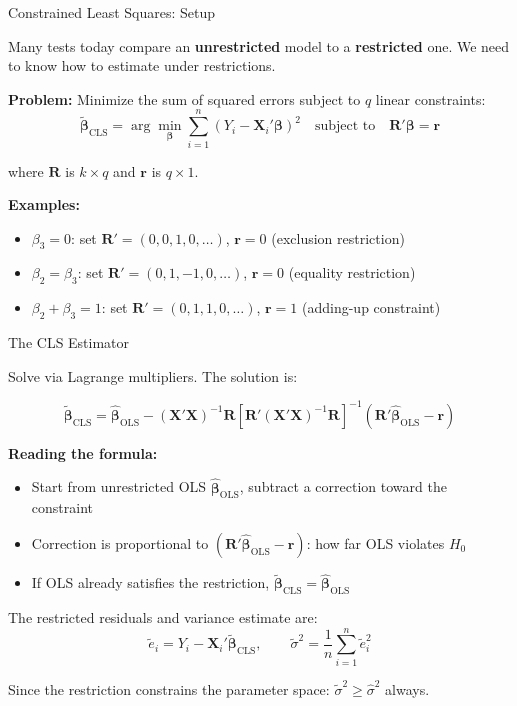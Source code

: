 \documentclass[handout, aspectratio=169]{beamer}
\numberwithin{equation}{section}
\begin{document}
\begin{frame}{Constrained Least Squares: Setup}

Many tests today compare an \textbf{unrestricted} model to a \textbf{restricted} one.  We need to know how to estimate under restrictions.

\pause
\bigskip

\textbf{Problem:} Minimize the sum of squared errors subject to $q$ linear constraints:
$$\tilde{\bm{\beta}}_{\text{CLS}} = \arg\min_{\bm{\beta}} \sum_{i=1}^n (Y_i - \bm{X}_i'\bm{\beta})^2 \quad \text{subject to} \quad \bm{R}'\bm{\beta} = \bm{r}$$

where $\bm{R}$ is $k \times q$ and $\bm{r}$ is $q \times 1$.

\pause
\bigskip

\textbf{Examples:}
\begin{itemize}
\item $\beta_3 = 0$: set $\bm{R}' = (0, 0, 1, 0, \ldots)$, $\bm{r} = 0$ \quad (exclusion restriction)
\item $\beta_2 = \beta_3$: set $\bm{R}' = (0, 1, -1, 0, \ldots)$, $\bm{r} = 0$ \quad (equality restriction)
\item $\beta_2 + \beta_3 = 1$: set $\bm{R}' = (0, 1, 1, 0, \ldots)$, $\bm{r} = 1$ \quad (adding-up constraint)
\end{itemize}
\end{frame}

\begin{frame}{The CLS Estimator}

Solve via Lagrange multipliers.  The solution is:

$$\boxed{\tilde{\bm{\beta}}_{\text{CLS}} = \hat{\bm{\beta}}_{\text{OLS}} - (\bm{X}'\bm{X})^{-1}\bm{R}\left[\bm{R}'(\bm{X}'\bm{X})^{-1}\bm{R}\right]^{-1}(\bm{R}'\hat{\bm{\beta}}_{\text{OLS}} - \bm{r})}$$

\pause
\smallskip

\textbf{Reading the formula:}
\begin{itemize}
\item Start from unrestricted OLS $\hat{\bm{\beta}}_{\text{OLS}}$, subtract a correction toward the constraint
\item Correction is proportional to $(\bm{R}'\hat{\bm{\beta}}_{\text{OLS}} - \bm{r})$: how far OLS violates $H_0$
\item If OLS already satisfies the restriction, $\tilde{\bm{\beta}}_{\text{CLS}} = \hat{\bm{\beta}}_{\text{OLS}}$
\end{itemize}

\pause
\smallskip

The restricted residuals and variance estimate are:
$$\tilde{e}_i = Y_i - \bm{X}_i'\tilde{\bm{\beta}}_{\text{CLS}}, \qquad \tilde{\sigma}^2 = \frac{1}{n}\sum_{i=1}^n \tilde{e}_i^2$$

Since the restriction constrains the parameter space: $\tilde{\sigma}^2 \geq \hat{\sigma}^2$ always.
\end{frame}
\end{document}
